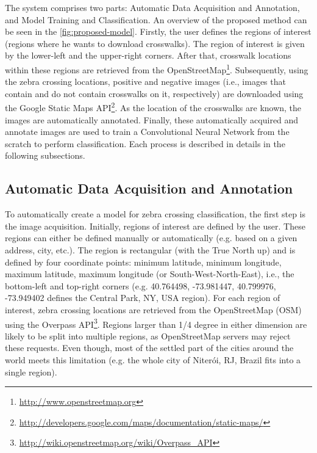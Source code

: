 \documentclass[journal]{IEEEtran}
\newcommand{\GoogleStaticMapsAPI}{Google Static Maps API\xspace}
\newcommand{\OpenStreetMap}{OpenStreetMap\xspace}
\begin{document}
The system comprises two parts: Automatic Data Acquisition and Annotation, and Model Training and Classification. An overview of the proposed method can be seen in the \autoref{fig:proposed-model}. Firstly, the user defines the regions of interest (regions where he wants to download crosswalks). The region of interest is given by the lower-left and the upper-right corners. After that, crosswalk locations within these regions are retrieved from the \OpenStreetMap\footnote{\url{http://www.openstreetmap.org}}. Subsequently, using the zebra crossing locations, positive and negative images (i.e., images that contain and do not contain crosswalks on it, respectively) are downloaded using the \GoogleStaticMapsAPI\footnote{\url{http://developers.google.com/maps/documentation/static-maps/}}. As the location of the crosswalks are known, the images are automatically annotated. Finally, these automatically acquired and annotate images are used to train a Convolutional Neural Network from the scratch to perform classification. Each process is described in details in the following subsections.

\subsection{Automatic Data Acquisition and Annotation}
To automatically create a model for zebra crossing classification, the first step is the image acquisition. Initially, regions of interest are defined by the user. These regions can either be defined manually or automatically (e.g. based on a given address, city, etc.). The region is rectangular (with the True North up) and is defined by four coordinate points: minimum latitude, minimum longitude, maximum latitude, maximum longitude (or South-West-North-East), i.e., the bottom-left and top-right corners (e.g. 40.764498, -73.981447, 40.799976, -73.949402 defines the Central Park, NY, USA region). For each region of interest, zebra crossing locations are retrieved from the OpenStreetMap (OSM) using the Overpass API\footnote{\url{http://wiki.openstreetmap.org/wiki/Overpass_API}}. Regions larger than 1/4 degree in either dimension are likely to be split into multiple regions, as OpenStreetMap servers may reject these requests. Even though, most of the settled part of the cities around the world meets this limitation (e.g. the whole city of Niterói, RJ, Brazil fits into a single region).
\end{document}
